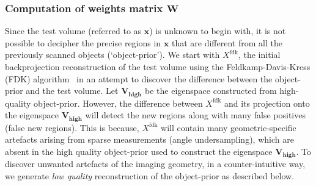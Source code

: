 \documentclass[journal]{IEEEtran}
\begin{document}
 \subsubsection{\textbf{Computation of weights matrix $\boldsymbol{W}$}}
Since the test volume (referred to as $\boldsymbol{x}$) is unknown to begin with, it is not possible to decipher the precise regions in $\boldsymbol{x}$ that are different from all the previously scanned objects (`object-prior'). We start with $X^{\text{fdk}}$, the initial backprojection reconstruction of the test volume using the Feldkamp-Davis-Kress (FDK) algorithm~\cite{FDK} in an attempt to discover the difference between the object-prior and the test volume. Let $\boldsymbol{V_{\text{high}}}$ be the eigenspace constructed from high-quality object-prior. However, the difference between $X^{\text{fdk}}$ and its projection onto the eigenspace $\boldsymbol{V_{\text{high}}}$ will detect the new regions along with  many false positives (false new regions). This is because, $X^{\text{fdk}}$ will contain many geometric-specific artefacts arising from sparse measurements (angle undersampling), which are absent in the high quality object-prior used to construct the eigenspace $\boldsymbol{V_{\text{high}}}$. To discover unwanted artefacts of the imaging geometry, in a counter-intuitive way, we generate \emph{low quality} reconstruction of the object-prior as described below.
\vspace{2mm}
\end{document}

